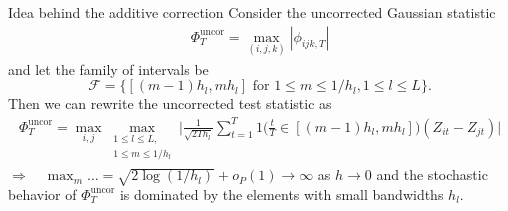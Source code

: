 \documentclass[10pt]{beamer}
\begin{document}
\begin{frame}{Idea behind the additive correction}
Consider the uncorrected Gaussian statistic
\begin{align*}
\Phi_{T}^{\text{uncor}} = \max_{(i,j,k)} |\phi_{ijk, T}|
\end{align*}\pause
and let the family of intervals be \[\mathcal{F} = \big\{[(m-1) h_l, m h_l] \text{ for } 1\le m \le 1/h_l, 1 \le l \le L\big\}.\]\pause
Then we can rewrite the uncorrected test statistic as
\begin{align*}
\Phi_{T}^{\text{uncor}} = \max_{i, j} \max_{\substack{1 \le l \le L, \\ 1\le m \le 1/h_l}} \Big|\frac{1}{\sqrt{2 T h_l}} \sum\limits_{t=1}^T 1 \Big( \frac{t}{T} \in [(m-1) h_l, m h_l] \Big) (Z_{it} - Z_{jt})\Big|
\end{align*}\pause
$\Rightarrow \quad \max_m \ldots =\sqrt{2\log(1/h_l)} + o_P(1) \to \infty$ as $h \to 0$ and the stochastic behavior of $\Phi_{T}^{\text{uncor}}$ is dominated by the elements with small bandwidths $h_l$. \hyperlink{frame_test<4>}{}
\end{frame}
\end{document}
